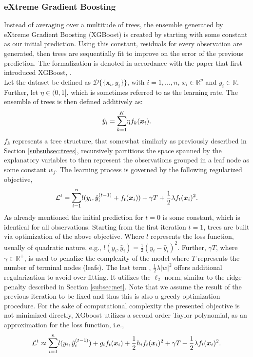 \documentclass[a4paper,12pt, headsepline]{scrartcl}
\numberwithin{equation}{section}
\begin{document}
\subsubsection{eXtreme Gradient Boosting}\label{subsubsec:xgb}
Instead of averaging over a multitude of trees, the ensemble generated by eXtreme Gradient Boosting (XGBoost) is created by starting with some constant as our initial prediction. Using this constant, residuals for every observation are generated, then trees are sequentially fit to improve on the error of the previous prediction. The formalization is denoted in accordance with the paper that first introduced XGBoost, \citet{chen2016}.\\
Let the dataset be defined as $\mathcal{D}\{\{\bm x_i, y_i\}\}$, with $i = 1, ..., n$, $x_i \in \mathbb{R}^p$ and $y_i \in \mathbb{R}$. Further, let $\eta \in (0, 1]$, which is sometimes referred to as the learning rate. The ensemble of trees is then defined additively as:
\[
\hat y_i = \mathlarger{\sum}\limits_{k = 1}^K \eta f_k(\bm x_i).
\]
$f_k$ represents a tree structure, that somewhat similarly as previously described in Section \ref{subsubsec:trees}, recursively partitions the space spanned by the explanatory variables to then represent the observations grouped in a leaf node as some constant $w_j$. The learning process is governed by the following regularized objective,
\[
\mathcal{L}^t = \mathlarger{\sum}\limits_{i = 1}^n l( y_i, \hat y_i^{(t - 1)} + f_t(\bm x_i)) + \gamma T + \frac{1}{2}\lambda f_t(\bm x_i)^2.
\]
As already mentioned the initial prediction for $t = 0$ is some constant, which is identical for all observations. Starting from the first iteration $t = 1$, trees are built via optimization of the above objective. Where $l$ represents the loss function, usually of quadratic nature, e.g., $l(y_i, \hat y_i) = \frac{1}{2} (y_i - \hat y_i)^2$. Further, $\gamma T$, where $\gamma \in \mathbb{R}^+$, is used to penalize the complexity of the model where $T$ represents the number of terminal nodes (leafs). The last term , $\frac{1}{2}\lambda|w|^2$ offers additional regularization to avoid over-fitting. It utilizes the $\ell_2$ norm, similar to the ridge penalty described in Section \ref{subsec:net}. Note that we assume the result of the previous iteration to be fixed and thus this is also a greedy optimization procedure. For the sake of computational complexity the presented objective is not minimized directly, XGboost utilizes a second order Taylor polynomial, as an approximation for the loss function, i.e.,
\[
\mathcal{L}^t \approx \mathlarger{\sum}\limits_{i = 1}^n l( y_i, \hat y_i^{(t - 1)}) + g_i f_t(\bm x_i) + \frac{1}{2}h_i f_t( \bm x_i)^2 + \gamma T + \frac{1}{2}\lambda f_t(\bm x_i)^2.
\]
\end{document}
